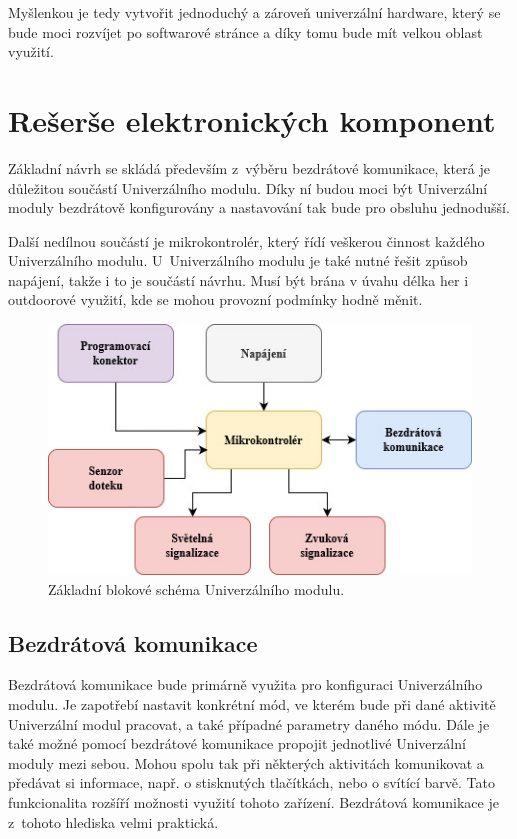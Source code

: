 Myšlenkou je tedy vytvořit jednoduchý a zároveň univerzální hardware, který se bude moci rozvíjet po softwarové stránce a díky tomu bude mít velkou 
oblast využití. 


\chapter{Rešerše elektronických komponent}
Základní návrh se skládá především z~výběru bezdrátové komunikace, která je důležitou součástí Univerzálního modulu. Díky ní budou moci být Univerzální 
moduly bezdrátově konfigurovány a nastavování tak bude pro obsluhu jednodušší. 

Další nedílnou součástí je mikrokontrolér, který řídí veškerou činnost každého Univerzálního modulu. U~Univerzálního modulu je také nutné řešit způsob napájení,
takže i to je součástí návrhu. Musí být brána v úvahu délka her i outdoorové využití, kde se mohou provozní podmínky hodně měnit. 

\begin{figure}[!h]
  \begin{center}
    \includegraphics[scale=0.75]{obrazky/zakladni_blokove_schema.jpg}
  \end{center}
  \caption[Základní blokové schéma Univerzálního modulu]{Základní blokové schéma Univerzálního modulu.}
\end{figure}

\section{Bezdrátová komunikace}
Bezdrátová komunikace bude primárně využita pro konfiguraci Univerzálního modulu. Je zapotřebí nastavit konkrétní mód, ve kterém bude při dané 
aktivitě Univerzální modul pracovat, a také případné parametry daného módu. Dále je také možné pomocí bezdrátové komunikace propojit jednotlivé 
Univerzální moduly mezi sebou. Mohou spolu tak při některých aktivitách komunikovat a předávat si informace, např. o stisknutých tlačítkách, nebo 
o svítící barvě. Tato funkcionalita rozšíří možnosti využití tohoto zařízení. Bezdrátová komunikace je z~tohoto hlediska velmi praktická. 


